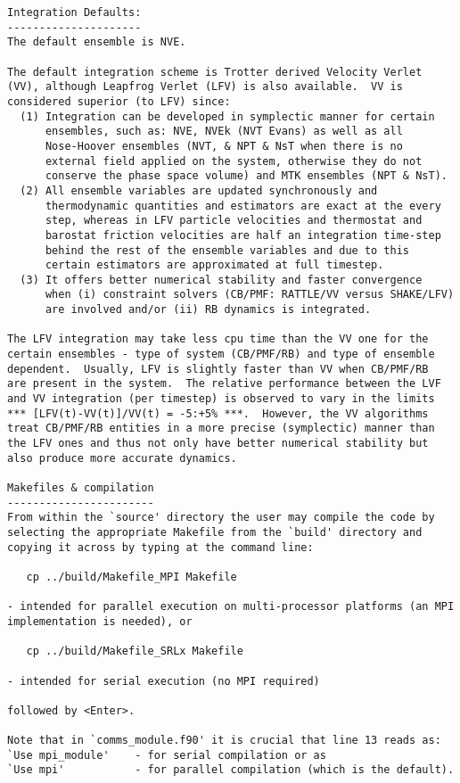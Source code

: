\begin{verbatim}
Integration Defaults:
---------------------
The default ensemble is NVE.

The default integration scheme is Trotter derived Velocity Verlet
(VV), although Leapfrog Verlet (LFV) is also available.  VV is
considered superior (to LFV) since:
  (1) Integration can be developed in symplectic manner for certain
      ensembles, such as: NVE, NVEk (NVT Evans) as well as all
      Nose-Hoover ensembles (NVT, & NPT & NsT when there is no
      external field applied on the system, otherwise they do not
      conserve the phase space volume) and MTK ensembles (NPT & NsT).
  (2) All ensemble variables are updated synchronously and
      thermodynamic quantities and estimators are exact at the every
      step, whereas in LFV particle velocities and thermostat and
      barostat friction velocities are half an integration time-step
      behind the rest of the ensemble variables and due to this
      certain estimators are approximated at full timestep.
  (3) It offers better numerical stability and faster convergence
      when (i) constraint solvers (CB/PMF: RATTLE/VV versus SHAKE/LFV)
      are involved and/or (ii) RB dynamics is integrated.

The LFV integration may take less cpu time than the VV one for the
certain ensembles - type of system (CB/PMF/RB) and type of ensemble
dependent.  Usually, LFV is slightly faster than VV when CB/PMF/RB
are present in the system.  The relative performance between the LVF
and VV integration (per timestep) is observed to vary in the limits
*** [LFV(t)-VV(t)]/VV(t) = -5:+5% ***.  However, the VV algorithms
treat CB/PMF/RB entities in a more precise (symplectic) manner than
the LFV ones and thus not only have better numerical stability but
also produce more accurate dynamics.

Makefiles & compilation
-----------------------
From within the `source' directory the user may compile the code by
selecting the appropriate Makefile from the `build' directory and
copying it across by typing at the command line:

   cp ../build/Makefile_MPI Makefile

- intended for parallel execution on multi-processor platforms (an MPI
implementation is needed), or

   cp ../build/Makefile_SRLx Makefile

- intended for serial execution (no MPI required)

followed by <Enter>.

Note that in `comms_module.f90' it is crucial that line 13 reads as:
`Use mpi_module'    - for serial compilation or as
`Use mpi'           - for parallel compilation (which is the default).


\end{verbatim}
